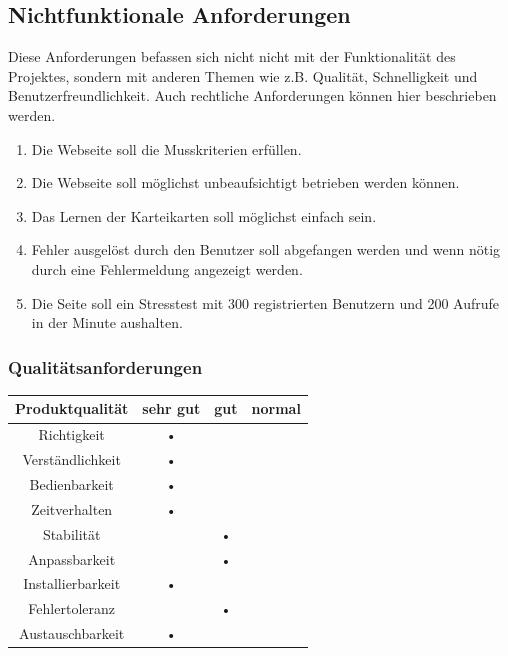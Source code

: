 \subsection{Nichtfunktionale Anforderungen}
Diese Anforderungen befassen sich nicht nicht mit der Funktionalität des Projektes, sondern mit anderen Themen wie z.B. Qualität, Schnelligkeit und Benutzerfreundlichkeit. Auch rechtliche Anforderungen können hier beschrieben werden.

\begin{enumerate}[leftmargin=2cm, label=\bfseries /NF\arabic*0/]
	 \item Die Webseite soll die Musskriterien erfüllen.
     \item Die Webseite soll möglichst unbeaufsichtigt betrieben werden können.
     \item Das Lernen der Karteikarten soll möglichst einfach sein.
     \item Fehler ausgelöst durch den Benutzer soll abgefangen werden und wenn nötig durch eine Fehlermeldung angezeigt werden.
     \item Die Seite soll ein Stresstest mit 300 registrierten Benutzern und 200 Aufrufe in der Minute aushalten.
\end{enumerate}

\subsubsection{Qualitätsanforderungen}
\begin{center}
\begin{tabular}{|c|c|c|c|}
\hline 
\textbf{Produktqualität} & \textbf{sehr gut} & \textbf{gut} & \textbf{normal} \\ 
\hline 
Richtigkeit & • && \\ 
\hline 
Verständlichkeit & • & & \\ 
\hline 
Bedienbarkeit & • & & \\ 
\hline 
Zeitverhalten & • & & \\ 
\hline 
Stabilität & & • & \\ 
\hline 
Anpassbarkeit & & • & \\ 
\hline 
Installierbarkeit & • & & \\ 
\hline 
Fehlertoleranz & & • & \\ 
\hline 
Austauschbarkeit & • & & \\ 
\hline 
\end{tabular}
\end{center}

